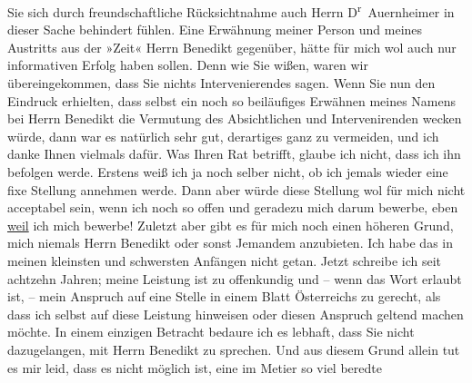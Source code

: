\begin{ledgroupsized}[t]{13cm}
               Sie sich durch freundschaftliche Rücksichtnahme auch Herrn D\textsuperscript{r} Auernheimer in dieser Sache behindert fühlen. Eine
               Erwähnung meiner Person und meines Austritts aus der »Zeit« Herrn Benedikt gegenüber, hätte für mich
               wol auch nur informativen Erfolg haben sollen. Denn wie Sie wißen, waren wir
               übereingekommen, dass Sie nichts Intervenierendes sagen. Wenn Sie nun den Eindruck
               erhielten, dass selbst ein noch so beiläufiges Erwähnen meines Namens bei Herrn Benedikt die Vermutung des Absichtlichen und
               Intervenirenden wecken würde, dann war es natürlich sehr gut, derartiges ganz zu
               vermeiden, und ich danke Ihnen vielmals dafür. Was Ihren Rat betrifft, glaube ich
               nicht, dass ich ihn befolgen werde. Erstens weiß ich ja noch selber nicht, ob ich
               jemals wieder eine fixe {\pb}Stellung annehmen werde. Dann aber würde diese Stellung wol für mich nicht acceptabel
               sein, wenn ich noch so offen und geradezu mich darum bewerbe, {\dotstwo} eben \uline{weil} ich mich bewerbe! Zuletzt aber gibt es für mich
               noch einen höheren Grund, mich niemals Herrn Benedikt
               oder sonst Jemandem anzubieten. Ich habe das in meinen kleinsten und schwersten
               Anfängen nicht getan. Jetzt schreibe ich seit achtzehn Jahren; meine Leistung ist zu
               offenkundig und – wenn das Wort erlaubt ist, – mein Anspruch auf eine Stelle in einem
               Blatt Österreichs zu gerecht, als dass ich selbst auf diese Leistung hinweisen oder
               diesen Anspruch geltend machen möchte. \pend
           \pstart
           In einem einzigen Betracht bedaure ich es lebhaft, dass Sie nicht dazugelangen, mit
               Herrn Benedikt zu sprechen. Und aus diesem Grund allein
               tut es mir leid, dass es nicht möglich ist, eine im Metier so viel beredte

\end{ledgroupsized}
